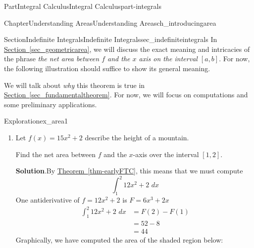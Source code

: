 \documentclass{tufte-book}
\newcommand{\blocktitlefont}{\relax}
\newcommand{\xreffont}{\relax}
\numberwithin{equation}{chapter}
\newcommand{\intdx}[1]{{\,\int#1\,\,dx}}
\newcommand{\amp}{&}
\begin{document}
\begin{partptx}{Part}{Integral Calculus}{}{Integral Calculus}{}{}{part-integrals}
\begin{chapterptx}{Chapter}{Understanding Areas}{}{Understanding Areas}{}{}{ch_introducingarea}
\begin{sectionptx}{Section}{Indefinite Integrals}{}{Indefinite Integrals}{}{}{sec_indefiniteintegrals}
In \hyperref[sec_geometricarea]{Section~{\xreffont\ref{sec_geometricarea}}}, we will discuss the exact meaning and intricacies of the phrase \emph{the net area between \(f\) and the \(x\) axis on the interval \([a,b]\)}. For now, the following illustration should suffice to show its general meaning.%
\begin{image}{0.25}{0.5}{0.25}{}%
%
\end{image}%
We will talk about \emph{why} this theorem is true in \hyperref[sec_fundamentaltheorem]{Section~{\xreffont\ref{sec_fundamentaltheorem}}}.  For now, we will focus on computations and some preliminary applications.%
\begin{exploration}{Exploration}{}{ex_area1}%
\begin{enumerate}[font=\bfseries,label=(\alph*),ref=\alph*]%
\item{}Let \(f(x) = 15x^2 + 2\) describe the height of a mountain.%
\par
Find the net area between \(f\) and the \(x\)-axis over the interval \([1,2]\).%
\par\smallskip%
\noindent\textbf{\blocktitlefont Solution}.\hypertarget{ex_area1-1-2}{}\quad{}By \hyperref[thm-earlyFTC]{Theorem~{\xreffont\ref{thm-earlyFTC}}}, this means that we must compute%
\begin{equation*}
\intdx{_1^2  12x^2 + 2 }
\end{equation*}
One antiderivative of \(f=12x^2 + 2\) is \(F=6x^3 + 2x\)%
\begin{align*}
\intdx{_1^2  12x^2 + 2 } \amp = F(2)-F(1)\\
\amp = 52 - 8 \\
\amp = 44     
\end{align*}
Graphically, we have computed the area of the shaded region below:%
\begin{image}{0.25}{0.5}{0.25}{}%

\end{image}
\end{enumerate}
\end{exploration}
\end{sectionptx}
\end{chapterptx}
\end{partptx}
\end{document}
